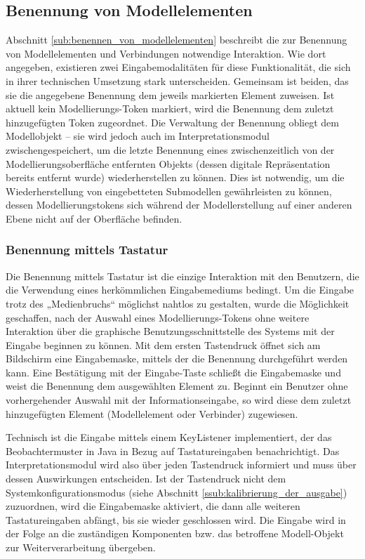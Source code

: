 \subsection{Benennung von Modellelementen} %
\label{sub:benennung_von_modellelementen}

Abschnitt \ref{sub:benennen_von_modellelementen} beschreibt die zur Benennung von Modellelementen und Verbindungen notwendige Interaktion. Wie dort angegeben, existieren zwei Eingabemodalitäten für diese Funktionalität, die sich in ihrer technischen Umsetzung stark unterscheiden. Gemeinsam ist beiden, das sie die angegebene Benennung dem jeweils markierten Element zuweisen. Ist aktuell kein Modellierungs-Token markiert, wird die Benennung dem zuletzt hinzugefügten Token zugeordnet. Die Verwaltung der Benennung obliegt dem Modellobjekt -- sie wird jedoch auch im Interpretationsmodul zwischengespeichert, um die letzte Benennung eines zwischenzeitlich von der Modellierungsoberfläche entfernten Objekts (dessen digitale Repräsentation bereits entfernt wurde) wiederherstellen zu können. Dies ist notwendig, um die Wiederherstellung von eingebetteten Submodellen gewährleisten zu können, dessen Modellierungstokens sich während der Modellerstellung auf einer anderen Ebene nicht auf der Oberfläche befinden. 

\subsubsection{Benennung mittels Tastatur} %
\label{ssub:benennung_mittels_tastatur}

Die Benennung mittels Tastatur ist die einzige Interaktion mit den Benutzern, die die Verwendung eines herkömmlichen Eingabemediums bedingt. Um die Eingabe trotz des „Medienbruchs“ möglichst nahtlos zu gestalten, wurde die Möglichkeit geschaffen, nach der Auswahl eines Modellierungs-Tokens ohne weitere Interaktion über die graphische Benutzungsschnittstelle des Systems mit der Eingabe beginnen zu können. Mit dem ersten Tastendruck öffnet sich am Bildschirm eine Eingabemaske, mittels der die Benennung durchgeführt werden kann. Eine Bestätigung mit der Eingabe-Taste schließt die Eingabemaske und weist die Benennung dem ausgewählten Element zu. Beginnt ein Benutzer ohne vorhergehender Auswahl mit der Informationseingabe, so wird diese dem zuletzt hinzugefügten Element (Modellelement oder Verbinder) zugewiesen.

Technisch ist die Eingabe mittels einem KeyListener implementiert, der das Beobachtermuster \citep{Gamma95} in Java in Bezug auf Tastatureingaben benachrichtigt. Das Interpretationsmodul wird also über jeden Tastendruck informiert und muss über dessen Auswirkungen entscheiden. Ist der Tastendruck nicht dem Systemkonfigurationsmodus (siehe Abschnitt \ref{ssub:kalibrierung_der_ausgabe}) zuzuordnen, wird die Eingabemaske aktiviert, die dann alle weiteren Tastatureingaben abfängt, bis sie wieder geschlossen wird. Die Eingabe wird in der Folge an die zuständigen Komponenten bzw. das betroffene Modell-Objekt zur Weiterverarbeitung übergeben.

